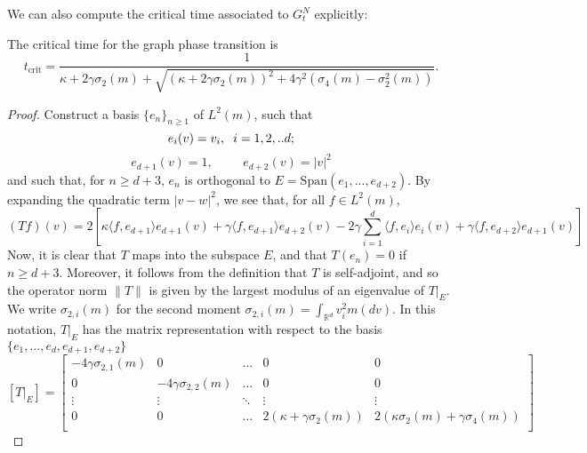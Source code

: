 We can also compute the critical time associated to $G^N_t$ explicitly:
\begin{lemma}\label{lemma: computation of tcrit} The critical time for the graph phase transition is \begin{equation}
       t_\text{crit}= \frac{1}{\kappa +2\gamma\sigma_2(m) + \sqrt{(\kappa+2\gamma\sigma_2(m))^2+4\gamma^2(\sigma_4(m)-\sigma_2^2(m))}}.
   \end{equation}\end{lemma} \begin{proof} Construct a basis $\{e_n\}_{n\geq 1}$ of $L^2(m)$, such that \begin{equation*}
       e_i(v)=v_i, \hspace{0.2cm}i=1,2,..d;
   \end{equation*}
   \begin{equation*}
       e_{d+1}(v)=1, \hspace{1cm}e_{d+2}(v)=|v|^2
   \end{equation*} and such that, for $n\geq d+3$, $e_n$ is orthogonal to $E=\text{Span}(e_1,...,e_{d+2})$.
   By expanding the quadratic term $|v-w|^2$, we see that, for all $f\in L^2(m),$ \begin{equation*} 
       (Tf)(v)  = 2\left[\kappa\langle f, e_{d+1}\rangle e_{d+1}(v)
       +\gamma \langle f, e_{d+1}\rangle e_{d+2}(v)
       -2\gamma \sum_{i=1}^d \langle f, e_i\rangle e_i(v)
       +\gamma \langle f, e_{d+2}\rangle e_{d+1}(v)\right]
   \end{equation*} 
  Now, it is clear that $T$ maps into the subspace $E$, and that $T(e_n)=0$ if $n\geq d+3.$ Moreover, it follows from the definition that $T$ is self-adjoint, and so the operator norm $\|T\|$ is given by the largest modulus of an eigenvalue of $T|_E.$ We write $\sigma_{2,i}(m)$ for the second moment $\sigma_{2,i}(m)=\int_{\mathbb{R}^d} v_i^2 m(dv)$. In this notation, $T|_E$ has the matrix representation with respect to the basis $\{e_1,...,e_d, e_{d+1}, e_{d+2}\}$ \begin{equation*}
       \left[T|_E\right]=\begin{bmatrix}
    -4\gamma\sigma_{2,1}(m) & 0  & \dots  & 0 &0 \\
    0 & -4\gamma\sigma_{2,2}(m)  & \dots  & 0 &0\\
    \vdots & \vdots  & \ddots & \vdots &\vdots \\
    0 & 0  & \dots  & 2(\kappa+\gamma\sigma_2(m)) & 2(\kappa\sigma_2(m)+\gamma \sigma_4(m)) \\ 

\end{bmatrix}
\end{equation*}
\end{proof}
